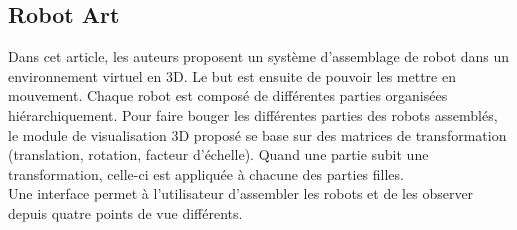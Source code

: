 \subsection{Robot Art}
Dans cet article, les auteurs proposent un système d'assemblage de robot dans un environnement virtuel en 3D. Le but est ensuite de pouvoir les mettre en mouvement. Chaque robot est composé de différentes parties organisées hiérarchiquement. Pour faire bouger les différentes parties des robots assemblés, le module de visualisation 3D proposé se base sur des matrices de transformation (translation, rotation, facteur d'échelle). Quand une partie subit une transformation, celle-ci est appliquée à chacune des parties filles. \\
Une interface permet à l'utilisateur d'assembler les robots et de les observer depuis quatre points de vue différents. 